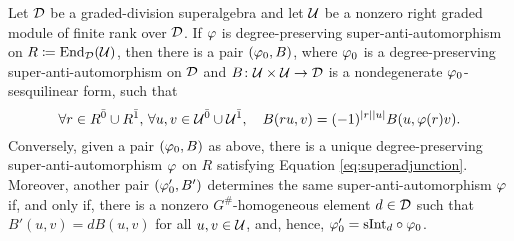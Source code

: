 \begin{thm}\label{thm:vphi-iff-vphi0-and-B}
	Let $\mathcal{D}$ be a graded-division superalgebra and let $\mathcal U$ be a nonzero right graded module of finite rank over $\mathcal{D}$.
	If $\varphi$ is degree-preserving super-anti-automorphism on $R \coloneqq \operatorname{End}_{\mathcal{D}}(\mathcal U)$, then there is a pair $(\varphi_0, B)$, where $\varphi_0$ is a degree-preserving super-anti-automorphism on $\mathcal{D}$ and $B\colon \mathcal U \times \mathcal U \to \mathcal{D}$ is a nondegenerate $\varphi_0$-sesquilinear form, such that
	\begin{equation}\label{eq:superadjunction}
		\forall r\in R^{\bar0} \cup R^{\bar1},\,\forall u, v \in \mathcal U^{\bar0} \cup \mathcal U^{\bar1},  \quad B(ru,v) = (-1)^{|r||u|} B(u,\varphi(r)v).
	\end{equation}
	Conversely, given a pair $(\varphi_0, B)$ as above, there is a unique degree-preserving super-anti-automorphism $\varphi$ on $R$ satisfying Equation \eqref{eq:superadjunction}.
	Moreover, another pair $(\varphi_0', B')$ determines the same super-anti-automorphism $\varphi$ if, and only if, there is a nonzero $G^\#$-homogeneous element $d\in \mathcal{D}$ such that $B'(u, v) = dB (u, v)$ for all $u, v \in \mathcal U$, and, hence, $\varphi_0' = \mathrm{sInt}_d \circ \varphi_0$.
\end{thm}

